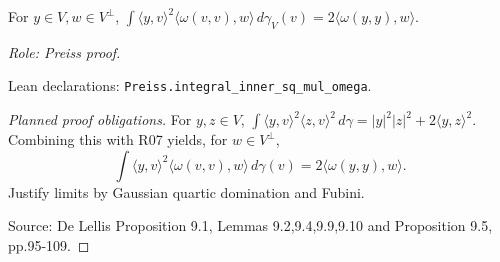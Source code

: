 \begin{lemma}
\label{lem:rigidity-omega-reproducing}







For $y\in V,w\in V^\perp$, $\int\langle y,v\rangle^2\langle\omega(v,v),w\rangle\,d\gamma_V(v)=2\langle\omega(y,y),w\rangle$.
\par\emph{Role: Preiss proof.}
\par Lean declarations: \texttt{Preiss.integral\_inner\_sq\_mul\_omega}.
\end{lemma}
\begin{proof}[Planned proof obligations]

For $y,z\in V$,
$\int\langle y,v\rangle^2\langle z,v\rangle^2\,d\gamma
=|y|^2|z|^2+2\langle y,z\rangle^2$.
Combining this with R07 yields, for $w\in V^\perp$,
\[
 \int\langle y,v\rangle^2\langle\omega(v,v),w\rangle\,d\gamma(v)
 =2\langle\omega(y,y),w\rangle.
\]
Justify limits by Gaussian quartic domination and Fubini.
\par Source: De Lellis Proposition 9.1, Lemmas 9.2,9.4,9.9,9.10 and Proposition 9.5, pp.95-109.
\end{proof}

